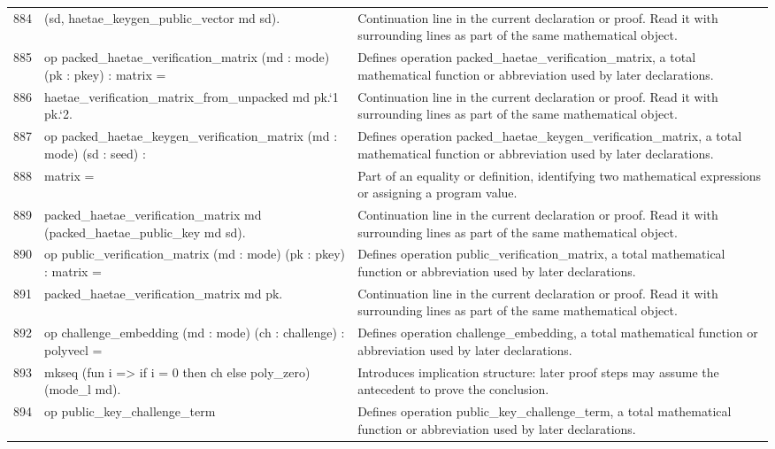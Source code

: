 \documentclass[10pt]{article}
\begin{document}
\begin{longtable}{r L{0.53\textwidth} L{0.37\textwidth}}
884 & {\ttfamily\scriptsize   (sd, haetae\_keygen\_public\_vector md sd).} & Continuation line in the current declaration or proof.  Read it with surrounding lines as part of the same mathematical object. \\
885 & {\ttfamily\scriptsize op packed\_haetae\_verification\_matrix (md : mode) (pk : pkey) : matrix =} & Defines operation packed\_haetae\_verification\_matrix, a total mathematical function or abbreviation used by later declarations. \\
886 & {\ttfamily\scriptsize   haetae\_verification\_matrix\_from\_unpacked md pk.`1 pk.`2.} & Continuation line in the current declaration or proof.  Read it with surrounding lines as part of the same mathematical object. \\
887 & {\ttfamily\scriptsize op packed\_haetae\_keygen\_verification\_matrix (md : mode) (sd : seed) :} & Defines operation packed\_haetae\_keygen\_verification\_matrix, a total mathematical function or abbreviation used by later declarations. \\
888 & {\ttfamily\scriptsize   matrix =} & Part of an equality or definition, identifying two mathematical expressions or assigning a program value. \\
889 & {\ttfamily\scriptsize   packed\_haetae\_verification\_matrix md (packed\_haetae\_public\_key md sd).} & Continuation line in the current declaration or proof.  Read it with surrounding lines as part of the same mathematical object. \\
890 & {\ttfamily\scriptsize op public\_verification\_matrix (md : mode) (pk : pkey) : matrix =} & Defines operation public\_verification\_matrix, a total mathematical function or abbreviation used by later declarations. \\
891 & {\ttfamily\scriptsize   packed\_haetae\_verification\_matrix md pk.} & Continuation line in the current declaration or proof.  Read it with surrounding lines as part of the same mathematical object. \\
892 & {\ttfamily\scriptsize op challenge\_embedding (md : mode) (ch : challenge) : polyvecl =} & Defines operation challenge\_embedding, a total mathematical function or abbreviation used by later declarations. \\
893 & {\ttfamily\scriptsize   mkseq (fun i => if i = 0 then ch else poly\_zero) (mode\_l md).} & Introduces implication structure: later proof steps may assume the antecedent to prove the conclusion. \\
894 & {\ttfamily\scriptsize op public\_key\_challenge\_term} & Defines operation public\_key\_challenge\_term, a total mathematical function or abbreviation used by later declarations. \\

\end{longtable}
\end{document}
